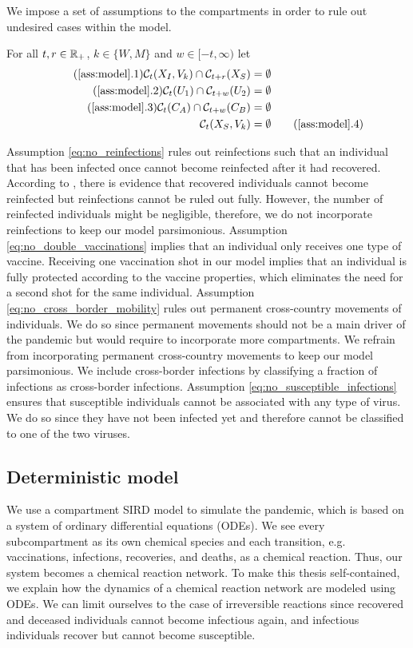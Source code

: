 We impose a set of assumptions to the compartments in order to rule out undesired cases within the model.
\begin{assumption}\label{ass:model}
For all $t,r \in \mathbb{R}_+$, $k \in \{W,M\}$ and $w \in [-t, \infty)$ let
\begin{align*}
\tag{\ref{ass:model}.1} 
\label{eq:no_reinfections}
\set(X_I, V_k) \cap \mathcal{C}_{t+r}(X_S) &= \emptyset \\
\tag{\ref{ass:model}.2} 
\label{eq:no_double_vaccinations}
\set(U_1) \cap \mathcal{C}_{t+w}(U_2) &= \emptyset \\
\tag{\ref{ass:model}.3} 
\label{eq:no_cross_border_mobility}
\set(C_A) \cap \mathcal{C}_{t+w}(C_B) &= \emptyset  \\
\set(X_S, V_k) &= \emptyset
\tag{\ref{ass:model}.4}
\label{eq:no_susceptible_infections}
\end{align*}
\end{assumption}
\noindent Assumption \ref{eq:no_reinfections} rules out reinfections such that an individual that has been infected once cannot become reinfected after it had recovered. According to \cite{Roy.2020}, there is evidence that recovered individuals cannot become reinfected but reinfections cannot be ruled out fully. However, the number of reinfected individuals might be negligible, therefore, we do not incorporate reinfections to keep our model parsimonious. Assumption \ref{eq:no_double_vaccinations} implies that an individual only receives one type of vaccine. Receiving one vaccination shot in our model implies that an individual is fully protected according to the vaccine properties, which eliminates the need for a second shot for the same individual. Assumption \ref{eq:no_cross_border_mobility} rules out permanent cross-country movements of individuals. We do so since  permanent movements should not be a main driver of the pandemic but would require to incorporate more compartments. We refrain from incorporating permanent cross-country movements to keep our model parsimonious. We include cross-border infections by classifying a fraction of infections as cross-border infections.
Assumption \ref{eq:no_susceptible_infections} ensures that susceptible individuals cannot be associated with any type of virus. We do so since they have not been infected yet and therefore cannot be classified to one of the two viruses.

\subsection{Deterministic model}
We use a compartment SIRD model to simulate the pandemic, which is based on a system of ordinary differential equations (ODEs). We see every subcompartment as its own chemical species and each transition, e.g. vaccinations, infections, recoveries, and deaths, as a chemical reaction. Thus, our system becomes a chemical reaction network. To make this thesis self-contained, we explain how the dynamics of a chemical reaction network are modeled using ODEs. We can limit ourselves to the case of irreversible reactions since recovered and deceased individuals cannot become infectious again, and infectious individuals recover but cannot become susceptible. \\

